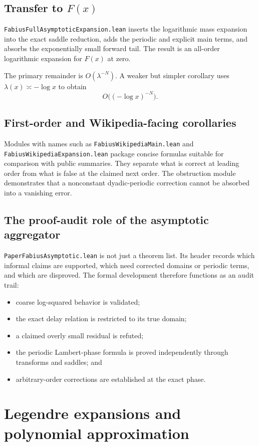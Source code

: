 \documentclass[11pt,oneside]{article}
\theoremstyle{definition}
\theoremstyle{remark}
\begin{document}
\subsection{Transfer to \texorpdfstring{\(F(x)\)}{F(x)}}
\nolinkurl{FabiusFullAsymptoticExpansion.lean} inserts the logarithmic mass expansion into the exact saddle reduction, adds the periodic and explicit main terms, and absorbs the exponentially small forward tail.  The result is an all-order logarithmic expansion for \(F(x)\) at zero.

The primary remainder is \(O(\lambda^{-N})\).  A weaker but simpler corollary uses \(\lambda(x)\asymp-\log x\) to obtain
\[
  O\bigl((-\log x)^{-N}\bigr).
\]

\subsection{First-order and Wikipedia-facing corollaries}
Modules with names such as \nolinkurl{FabiusWikipediaMain.lean} and \nolinkurl{FabiusWikipediaExpansion.lean} package concise formulas suitable for comparison with public summaries.  They separate what is correct at leading order from what is false at the claimed next order.  The obstruction module demonstrates that a nonconstant dyadic-periodic correction cannot be absorbed into a vanishing error.

\subsection{The proof-audit role of the asymptotic aggregator}
\nolinkurl{PaperFabiusAsymptotic.lean} is not just a theorem list.  Its header records which informal claims are supported, which need corrected domains or periodic terms, and which are disproved.  The formal development therefore functions as an audit trail:
\begin{itemize}
  \item coarse log-squared behavior is validated;
  \item the exact delay relation is restricted to its true domain;
  \item a claimed overly small residual is refuted;
  \item the periodic Lambert-phase formula is proved independently through transforms and saddles; and
  \item arbitrary-order corrections are established at the exact phase.
\end{itemize}

\section{Legendre expansions and polynomial approximation}\label{ch:legendre}
\end{document}
